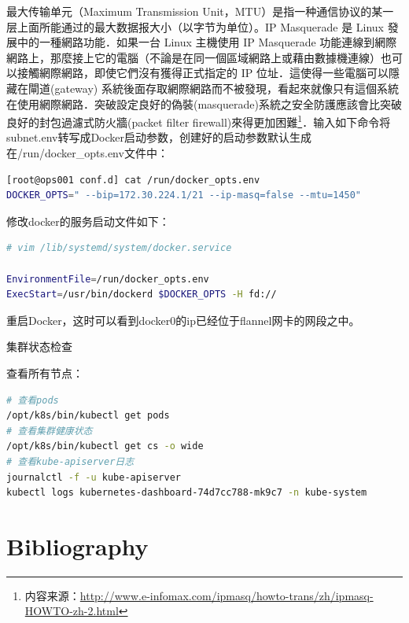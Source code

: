 \documentclass[8pt]{book}
\makeatletter
\numberwithin{dummy}{section}
\theoremstyle{ocrenumbox}
\theoremstyle{blacknumex}
\theoremstyle{blacknumbox}
\theoremstyle{ocrenum}
\renewcommand{\subsection}{\@startsection {subsection}{2}{\z@}
	{-3ex \@plus -0.1ex \@minus -.4ex}
	{0.5ex \@plus.2ex }
	{\normalfont\sffamily\bfseries}}
\makeatother
\begin{document}
最大传输单元（Maximum Transmission Unit，MTU）是指一种通信协议的某一层上面所能通过的最大数据报大小（以字节为单位）。IP Masquerade 是 Linux 發展中的一種網路功能．如果一台 Linux 主機使用 IP Masquerade 功能連線到網際網路上，那麼接上它的電腦（不論是在同一個區域網路上或藉由數據機連線）也可以接觸網際網路，即使它們沒有獲得正式指定的 IP 位址．這使得一些電腦可以隱藏在閘道(gateway) 系統後面存取網際網路而不被發現，看起來就像只有這個系統在使用網際網路．突破設定良好的偽裝(masquerade)系統之安全防護應該會比突破良好的封包過濾式防火牆(packet filter firewall)來得更加困難\footnote{内容来源：\url{http://www.e-infomax.com/ipmasq/howto-trans/zh/ipmasq-HOWTO-zh-2.html}}．输入如下命令将subnet.env转写成Docker启动参数，创建好的启动参数默认生成在/run/docker\_opts.env文件中：

\begin{lstlisting}[language=Bash]
[root@ops001 conf.d] cat /run/docker_opts.env
DOCKER_OPTS=" --bip=172.30.224.1/21 --ip-masq=false --mtu=1450"
\end{lstlisting}

修改docker的服务启动文件如下：

\begin{lstlisting}[language=Bash]
# vim /lib/systemd/system/docker.service

EnvironmentFile=/run/docker_opts.env
ExecStart=/usr/bin/dockerd $DOCKER_OPTS -H fd://
\end{lstlisting}

重启Docker，这时可以看到docker0的ip已经位于flannel网卡的网段之中。

\subsection{集群状态检查}

查看所有节点：

\begin{lstlisting}[language=Bash]
# 查看pods
/opt/k8s/bin/kubectl get pods
# 查看集群健康状态
/opt/k8s/bin/kubectl get cs -o wide
# 查看kube-apiserver日志
journalctl -f -u kube-apiserver
kubectl logs kubernetes-dashboard-74d7cc788-mk9c7 -n kube-system
\end{lstlisting}





\chapter*{Bibliography}
\end{document}

